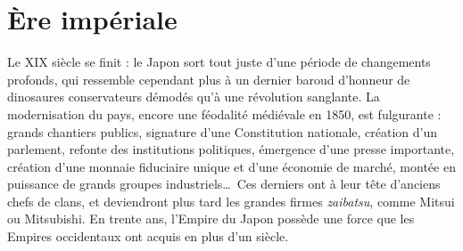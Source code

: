 \chapter{Ère impériale}


Le XIX siècle se finit : le Japon sort tout juste d'une période de
changements profonds, qui ressemble cependant plus à un dernier baroud
d'honneur de dinosaures conservateurs démodés qu'à une révolution sanglante. La
modernisation du pays, encore une féodalité médiévale en 1850, est fulgurante :
grands chantiers publics, signature d'une Constitution nationale, création d'un
parlement, refonte des institutions politiques, émergence d'une presse
importante, création d'une monnaie fiduciaire unique et d'une économie de
marché, montée en puissance de grands groupes industriels\dots\ Ces derniers
ont à leur tête d'anciens chefs de clans, et deviendront plus tard les grandes
firmes \emph{zaibatsu}, comme Mitsui ou Mitsubishi. En trente ans, l'Empire du
Japon possède une force que les Empires occidentaux ont acquis en plus d'un
siècle.

